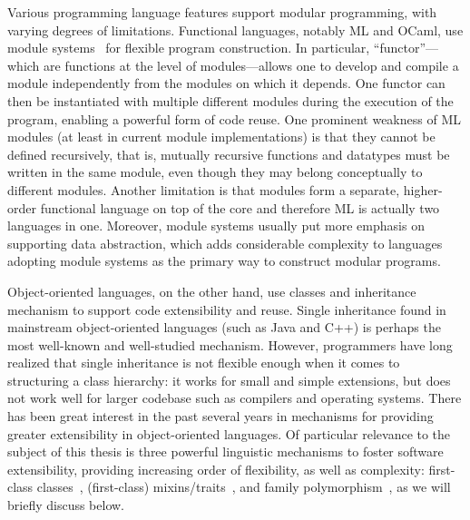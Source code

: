 Various programming language features support modular programming, with varying
degrees of limitations. Functional languages, notably ML and OCaml, use module
systems~\citep{MacQueen_1984} for flexible program construction. In particular,
``functor''---which are functions at the level of modules---allows
one to develop and compile a module independently from the modules on which it
depends. One functor can then be instantiated with multiple different modules
during the execution of the program, enabling a powerful form of code reuse. One
prominent weakness of ML modules (at least in current module implementations) is
that they cannot be defined recursively, that is, mutually recursive functions
and datatypes must be written in the same module, even though they may belong
conceptually to different modules. Another limitation is that modules form a
separate, higher-order functional language on top of the core and therefore ML
is actually two languages in one. Moreover, module systems usually put more
emphasis on supporting data abstraction, which adds considerable complexity to
languages adopting module systems as the primary way to construct modular
programs.

Object-oriented languages, on the other hand, use classes and inheritance
mechanism to support code extensibility and reuse. Single inheritance found in
mainstream object-oriented languages (such as Java and C++) is perhaps the most
well-known and well-studied mechanism. However, programmers have long realized
that single inheritance is not flexible enough when it comes to structuring a
class hierarchy: it works for small and simple extensions, but does not work
well for larger codebase such as compilers and operating systems. There
has been great interest in the past several years in mechanisms for providing
greater extensibility in object-oriented languages. Of particular relevance to
the subject of this thesis is three powerful linguistic mechanisms to foster software
extensibility, providing increasing order of flexibility, as well as complexity:
first-class classes~\citep{DBLP:conf/oopsla/TakikawaSDTF12}, (first-class)
mixins/traits~\citep{bracha1990mixin, scharli2003traits}, and family
polymorphism~\citep{Ernst_2001}, as we will briefly discuss below.


